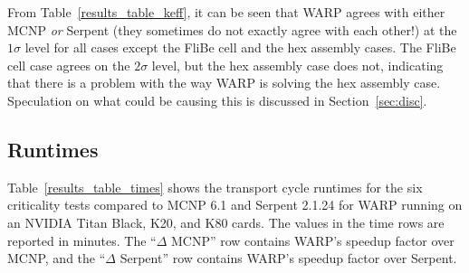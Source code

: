 \documentclass[preprint,12pt]{elsarticle}
\begin{document}
From Table~\ref{results_table_keff}, it can be seen that WARP agrees with either MCNP \emph{or} Serpent (they sometimes do not exactly agree with each other!) at the $1\sigma$ level for all cases except the FliBe cell and the hex assembly cases.  The FliBe cell case agrees on the $2\sigma$ level, but the hex assembly case does not, indicating that there is a problem with the way WARP is solving the hex assembly case.  Speculation on what could be causing this is discussed in Section~\ref{sec:disc}.


\subsection{Runtimes}
Table~\ref{results_table_times} shows the transport cycle runtimes for the six criticality tests compared to MCNP 6.1 and Serpent 2.1.24 for WARP running on an NVIDIA Titan Black, K20, and K80 cards.  The values in the time rows are reported in minutes.  The ``$\Delta$ MCNP'' row contains WARP's speedup factor over MCNP, and the ``$\Delta$ Serpent'' row contains WARP's speedup factor over Serpent.
\end{document}
